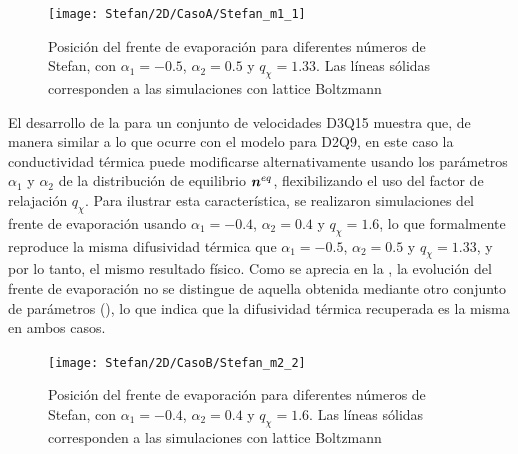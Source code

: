 \begin{figure}[ht]
	\centering
	\texttt{[image: Stefan/2D/CasoA/Stefan\_m1\_1]}
	\caption{Posici\'on del frente de evaporaci\'on para diferentes n\'umeros de Stefan, con $\alpha_1 = -0.5$, $\alpha_2=0.5$ y $q_{\chi} = 1.33$. Las l\'ineas s\'olidas corresponden a las simulaciones con lattice Boltzmann}
	\label{fig:Stefan_m1_1_3D}
\end{figure}

El desarrollo de la \lbe{} para un conjunto de velocidades D3Q15 muestra que, de manera similar a lo que ocurre con el modelo para D2Q9, en este caso la conductividad t\'ermica puede modificarse alternativamente usando los par\'ametros $\alpha_1$ y $\alpha_2$ de la distribuci\'on de equilibrio $\bm{n}^{eq}$, flexibilizando el uso del factor de relajaci\'on $q_{\chi}$. Para ilustrar esta caracter\'istica, se realizaron simulaciones del frente de evaporaci\'on usando $\alpha_1=-0.4$, $\alpha_2=0.4$ y $q_{\chi}=1.6$, lo que formalmente reproduce la misma difusividad t\'ermica que $\alpha_1=-0.5$, $\alpha_2=0.5$ y $q_{\chi}=1.33$, y por lo tanto, el mismo resultado f\'isico. Como se aprecia en la , la evoluci\'on del frente de evaporaci\'on no se distingue de aquella obtenida mediante otro conjunto de par\'ametros (), lo que indica que la difusividad t\'ermica recuperada es la misma en ambos casos. 

\begin{figure}[ht]
	\centering
	\texttt{[image: Stefan/2D/CasoB/Stefan\_m2\_2]}
	\caption{Posici\'on del frente de evaporaci\'on para diferentes n\'umeros de Stefan, con $\alpha_1 = -0.4$, $\alpha_2=0.4$ y $q_{\chi} = 1.6$. Las l\'ineas s\'olidas corresponden a las simulaciones con lattice Boltzmann}
	\label{fig:Stefan_m2_2_3D}
\end{figure}
\FloatBarrier